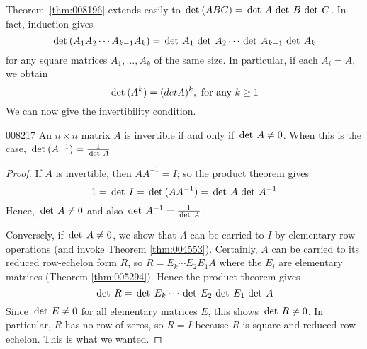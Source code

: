 Theorem~\ref{thm:008196} extends easily to $\thinspace\operatorname{det\medspace}(ABC) = \thinspace\operatorname{det \medspace} A \thinspace\operatorname{det \medspace} B \thinspace\operatorname{det \medspace} C$. In fact, induction gives
\begin{equation*}
\thinspace\operatorname{det\medspace}(A_1A_2 \cdots A_{k-1}A_k) = \thinspace\operatorname{det \medspace} A_1 \thinspace\operatorname{det \medspace} A_2 \cdots \thinspace\operatorname{det \medspace} A_{k-1} \thinspace\operatorname{det \medspace} A_k
\end{equation*}
for any square matrices $A_1, \dots, A_k$ of the same size. In particular, if each $A_i = A$, we obtain
\begin{equation*}
\thinspace\operatorname{det\medspace} (A^k) = (det A)^k, \mbox{ for any } k\geq 1
\end{equation*}
We can now give the invertibility condition.


\begin{theorem}{}{008217}
An $n \times n$ matrix $A$ is invertible if and only if $\thinspace\operatorname{det \medspace} A \neq 0$. When this is the case,
$ \thinspace\operatorname{det\medspace} (A^{-1}) = \tfrac{1}{\thinspace\operatorname{det \medspace} A}$ 
\end{theorem}

\begin{proof}
If $A$ is invertible, then $AA^{-1}=I$; so the product theorem gives
\begin{equation*}
1 = \thinspace\operatorname{det \medspace} I = \thinspace\operatorname{det\medspace} (AA^{-1}) = \thinspace\operatorname{det \medspace} A \thinspace\operatorname{det \medspace} A^{-1}
\end{equation*}
Hence, $\thinspace\operatorname{det \medspace} A \neq 0$ and also $\thinspace\operatorname{det \medspace} A^{-1} = \tfrac{1}{\thinspace\operatorname{det \medspace} A}$.

Conversely, if $\thinspace\operatorname{det \medspace} A \neq 0$, we show that $A$ can be carried to $I$ by elementary row operations (and invoke Theorem \ref{thm:004553}). Certainly, $A$ can be carried to its reduced row-echelon form $R$, so $R = E_k \cdots E_2E_1A$ where the $E_i$ are elementary matrices (Theorem \ref{thm:005294}). Hence the product theorem gives
\begin{equation*}
\thinspace\operatorname{det \medspace} R = \thinspace\operatorname{det \medspace} E_k \cdots \thinspace\operatorname{det \medspace} E_2 \thinspace\operatorname{det \medspace} E_1 \thinspace\operatorname{det \medspace} A
\end{equation*}
Since $\thinspace\operatorname{det \medspace} E \neq 0$ for all elementary matrices $E$, this shows $\thinspace\operatorname{det \medspace} R \neq 0$. In particular, $R$ has no row of zeros, so $R = I$ because $R$ is square and reduced row-echelon. This is what we wanted.
\end{proof}

